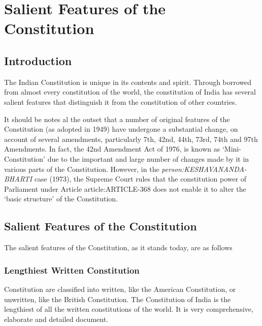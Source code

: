 \cleardoublepage

%

\chapter{Salient Features of the Constitution}

\begin{multicol}{2}

\section{Introduction}

The Indian Constitution is unique in its contents and spirit. Through borrowed from almost every constitution of the world, the constitution of India has several salient features that distinguish it from the constitution of other countries.

It should be notes al the outset that a number of original features of the Constitution (as adopted in 1949) have undergone a substantial change, on account of several amendments, particularly 7th, 42nd, 44th, 73rd, 74th and 97th Amendments. In fact, the 42nd Amendment Act of 1976, is known as `Mini-Constitution' due to the important and large number of changes made by it in various parts of the Constitution. However, in the { \textit{\gls{person:KESHAVANANDA-BHARTI}}} case (1973), the Supreme Court rules that the constitution power of Parliament under Article \gls{article:ARTICLE-368} does not enable it to alter the `basic structure' of the Constitution.

\section{Salient Features of the Constitution}

The salient features of the Constitution, as it stands today, are as follows

\subsection{Lengthiest Written Constitution}

Constitution are classified into written, like the American Constitution, or unwritten, like the British Constitution. The Constitution of India is the lengthiest of all the written constitutions of the world. It is very comprehensive, elaborate and detailed document.


\end{multicol}
